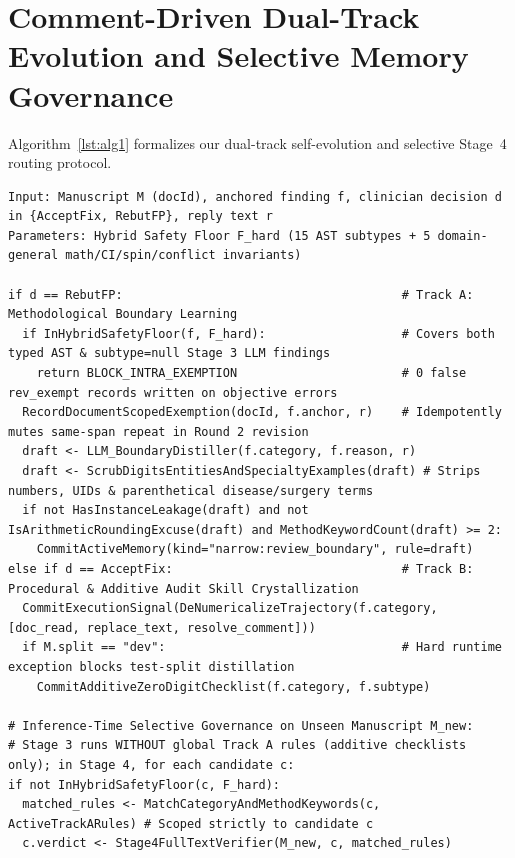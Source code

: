 \documentclass[11pt,a4paper]{article}
\begin{document}
\section{Comment-Driven Dual-Track Evolution and Selective Memory Governance}
\label{sec:evolution}

Algorithm~\ref{lst:alg1} formalizes our dual-track self-evolution and selective Stage~4 routing protocol.

\begin{lstlisting}[style=heurionspec,caption={Dual-Track Self-Evolution with 5-Invariant Hybrid Safety Floor $\mathcal{F}_{\text{hard}}$ \& Selective Stage-4 Routing},label={lst:alg1}]
Input: Manuscript M (docId), anchored finding f, clinician decision d in {AcceptFix, RebutFP}, reply text r
Parameters: Hybrid Safety Floor F_hard (15 AST subtypes + 5 domain-general math/CI/spin/conflict invariants)

if d == RebutFP:                                       # Track A: Methodological Boundary Learning
  if InHybridSafetyFloor(f, F_hard):                   # Covers both typed AST & subtype=null Stage 3 LLM findings
    return BLOCK_INTRA_EXEMPTION                       # 0 false rev_exempt records written on objective errors
  RecordDocumentScopedExemption(docId, f.anchor, r)    # Idempotently mutes same-span repeat in Round 2 revision
  draft <- LLM_BoundaryDistiller(f.category, f.reason, r)
  draft <- ScrubDigitsEntitiesAndSpecialtyExamples(draft) # Strips numbers, UIDs & parenthetical disease/surgery terms
  if not HasInstanceLeakage(draft) and not IsArithmeticRoundingExcuse(draft) and MethodKeywordCount(draft) >= 2:
    CommitActiveMemory(kind="narrow:review_boundary", rule=draft)
else if d == AcceptFix:                                # Track B: Procedural & Additive Audit Skill Crystallization
  CommitExecutionSignal(DeNumericalizeTrajectory(f.category, [doc_read, replace_text, resolve_comment]))
  if M.split == "dev":                                 # Hard runtime exception blocks test-split distillation
    CommitAdditiveZeroDigitChecklist(f.category, f.subtype)

# Inference-Time Selective Governance on Unseen Manuscript M_new:
# Stage 3 runs WITHOUT global Track A rules (additive checklists only); in Stage 4, for each candidate c:
if not InHybridSafetyFloor(c, F_hard):
  matched_rules <- MatchCategoryAndMethodKeywords(c, ActiveTrackARules) # Scoped strictly to candidate c
  c.verdict <- Stage4FullTextVerifier(M_new, c, matched_rules)
\end{lstlisting}
\end{document}
